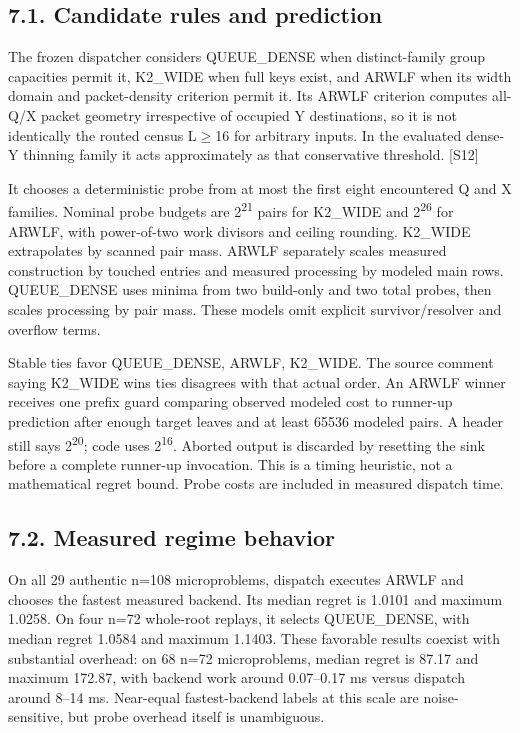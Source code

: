 \documentclass[10pt,letterpaper]{article}
\begin{document}
\subsection*{7.1. Candidate rules and prediction}

The frozen dispatcher considers QUEUE\_DENSE when distinct-family group capacities permit it, K2\_WIDE when full keys exist, and ARWLF when its width domain and packet-density criterion permit it. Its ARWLF criterion computes all-Q/X packet geometry irrespective of occupied Y destinations, so it is not identically the routed census L\ensuremath{\geq}16 for arbitrary inputs. In the evaluated dense-Y thinning family it acts approximately as that conservative threshold. [S12]


It chooses a deterministic probe from at most the first eight encountered Q and X families. Nominal probe budgets are 2\textsuperscript{2}\textsuperscript{1} pairs for K2\_WIDE and 2\textsuperscript{2}\textsuperscript{6} for ARWLF, with power-of-two work divisors and ceiling rounding. K2\_WIDE extrapolates by scanned pair mass. ARWLF separately scales measured construction by touched entries and measured processing by modeled main rows. QUEUE\_DENSE uses minima from two build-only and two total probes, then scales processing by pair mass. These models omit explicit survivor/resolver and overflow terms.


Stable ties favor QUEUE\_DENSE, ARWLF, K2\_WIDE. The source comment saying K2\_WIDE wins ties disagrees with that actual order. An ARWLF winner receives one prefix guard comparing observed modeled cost to runner-up prediction after enough target leaves and at least 65536 modeled pairs. A header still says 2\textsuperscript{2}\textsuperscript{0}; code uses 2\textsuperscript{1}\textsuperscript{6}. Aborted output is discarded by resetting the sink before a complete runner-up invocation. This is a timing heuristic, not a mathematical regret bound. Probe costs are included in measured dispatch time.


\subsection*{7.2. Measured regime behavior}

On all 29 authentic n=108 microproblems, dispatch executes ARWLF and chooses the fastest measured backend. Its median regret is 1.0101 and maximum 1.0258. On four n=72 whole-root replays, it selects QUEUE\_DENSE, with median regret 1.0584 and maximum 1.1403. These favorable results coexist with substantial overhead: on 68 n=72 microproblems, median regret is 87.17 and maximum 172.87, with backend work around 0.07--0.17 ms versus dispatch around 8--14 ms. Near-equal fastest-backend labels at this scale are noise-sensitive, but probe overhead itself is unambiguous.
\end{document}
